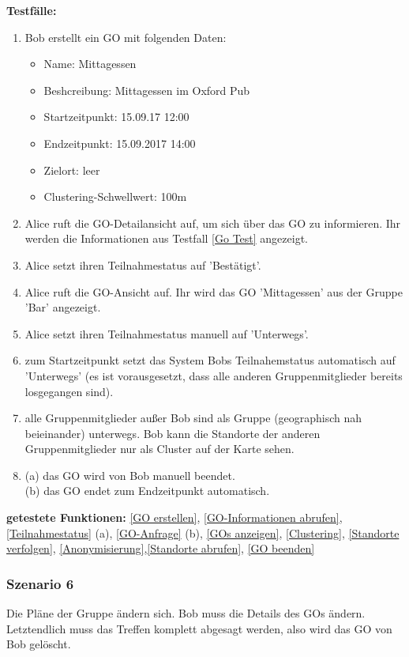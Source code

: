 \documentclass[parskip=full]{scrartcl}
\def\threedigits#1{%
  \ifnum#1<100 0\fi
  \ifnum#1<10 0\fi
  \number#1}
\begin{document}
\textbf{Testfälle:}
\begin{enumerate}[label={\textbf{/T\protect\threedigits{\theenumi}0/}}, leftmargin=*, resume]
	\item\label{Go Test} Bob erstellt ein GO mit folgenden Daten:
	\begin{itemize}
		\item Name: Mittagessen
		\item Beshcreibung: Mittagessen im Oxford Pub
		\item Startzeitpunkt: 15.09.17 12:00
		\item Endzeitpunkt: 15.09.2017 14:00
		\item Zielort: leer
		\item Clustering-Schwellwert: 100m
	\end{itemize}
	\item Alice ruft die GO-Detailansicht auf, um sich über das GO zu informieren. Ihr werden die Informationen aus Testfall \ref{Go Test} angezeigt.
	\item Alice setzt ihren Teilnahmestatus auf 'Bestätigt'.
	\item Alice ruft die GO-Ansicht auf. Ihr wird das GO 'Mittagessen' aus der Gruppe 'Bar' angezeigt.
	\item Alice setzt ihren Teilnahmestatus manuell auf 'Unterwegs'.
	\item zum Startzeitpunkt setzt das System Bobs Teilnahemstatus automatisch auf 'Unterwegs' (es ist vorausgesetzt, dass alle anderen Gruppenmitglieder bereits losgegangen sind).
	\item alle Gruppenmitglieder außer Bob sind als Gruppe (geographisch nah beieinander) unterwegs. Bob kann die Standorte der anderen Gruppenmitglieder nur als Cluster auf der Karte sehen.
	\item (a) das GO wird von Bob manuell beendet. \\
	 (b) das GO endet zum Endzeitpunkt automatisch.	
\end{enumerate}

\textbf{getestete Funktionen: }\ref{GO erstellen}, \ref{GO-Informationen abrufen}, \ref{Teilnahmestatus} (a), \ref{GO-Anfrage} (b), \ref{GOs anzeigen}, \ref{Clustering}, \ref{Standorte verfolgen}, \ref{Anonymisierung},\ref{Standorte abrufen}, \ref{GO beenden}

\subsubsection*{Szenario 6} Die Pläne der Gruppe ändern sich. Bob muss die Details des GOs ändern. Letztendlich muss das Treffen komplett abgesagt werden, also wird das GO von Bob gelöscht.\\
\end{document}
